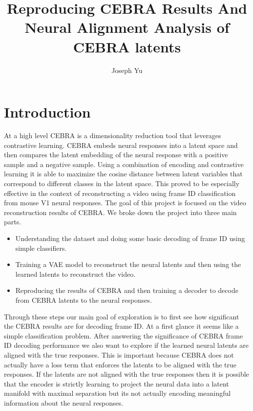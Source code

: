 \documentclass[12pt, letterpaper]{article}
\author{Joseph Yu}
\title{Reproducing CEBRA Results And Neural Alignment Analysis of CEBRA latents}
\begin{document}
\maketitle
\section{Introduction}
\label{sec:introduction}
At a high level CEBRA is a dimensionality reduction tool that leverages contrastive learning. CEBRA embeds neural responses into a latent space and then compares the latent embedding of the neural response with a positive sample and a negative sample. Using a combination of encoding and contrastive learning it is able to maximize the cosine distance between latent variables that correspond to different classes in the latent space. This proved to be especially effective in the context of reconstructing a video using frame ID classification from mouse V1 neural responses. The goal of this project is focused on the video reconstruction results of CEBRA. We broke down the project into three main parts. 
\begin{itemize}
    \item Understanding the dataset and doing some basic decoding of frame ID using simple classifiers.
    \item Training a VAE model to reconstruct the neural latents and then using the learned latents to reconstruct the video.
    \item Reproducing the results of CEBRA and then training a decoder to decode from CEBRA latents to the neural responses.
\end{itemize}

Through these steps our main goal of exploration is to first see how significant the CEBRA results are for decoding frame ID. At a first glance it seems like a simple classification problem. After answering the significance of CEBRA frame ID decoding performance we also want to explore if the learned neural latents are aligned with the true responses. This is important because CEBRA does not actually have a loss term that enforces the latents to be aligned with the true responses. If the latents are not aligned with the true responses then it is possible that the encoder is strictly learning to project the neural data into a latent manifold with maximal separation but its not actually encoding meaningful information about the neural responses.
\end{document}

